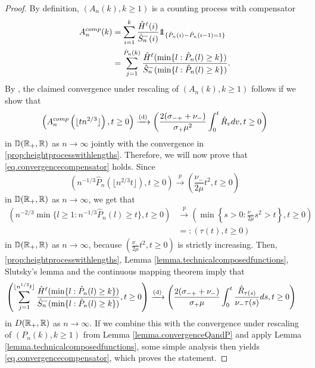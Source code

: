 \begin{proof}
By definition, $(A_n(k),k\geq 1)$ is a counting process with compensator 
\begin{align*}
    A_n^{comp}(k)&=\sum_{i=1}^k \frac{\hat{H}^\ell(i)}{\hat{S}^-_n(i)}\one_{\{\hat{P}_n(i)-\hat{P}_n(i-1)=1\}}\\
    &=\sum_{j=1}^{\hat{P}_n(k)}\frac{\hat{H}^\ell(\min\{l:\hat{P}_n(l)\geq k\})}{\hat{S}^-_n(\min\{l:\hat{P}_n(l)\geq k\})}.
\end{align*}
 By \citet[Theorem 14.2.VIII]{daleyIntroductionTheoryPoint2008}, the claimed convergence under rescaling of $(A_n(k),k\geq 1)$ follows if we show that 
\begin{equation}\label{eq.convergencecompensator}
    \left(A_n^{comp}\left(\lfloor tn^{2/3}\rfloor \right), t\geq 0\right)\xrightarrow[]{\mathrm{(d)}}\left(\frac{2(\sigma_{-+}+\nu_-)}{\sigma_+\mu^2} \int_0^t\hat{R}_v dv, t \geq 0\right)
\end{equation}
in ${\mathbb D}({\mathbb R}_+,{\mathbb R})$ as $n\to \infty$ jointly with the convergence in \cref{prop:heightprocesswithlengths}. Therefore, we will now prove that \cref{eq.convergencecompensator} holds. Since
$$\left(n^{-1/3}\hat{P}_n\left(\lfloor n^{2/3}t\rfloor \right),t\geq 0\right)\overset{p}{\to}\left(\frac{\nu_-}{2\mu}t^2,t\geq 0\right)$$
in ${\mathbb D}({\mathbb R}_+,{\mathbb R})$ as $n\to \infty$,
we get that
\begin{align*}\left(n^{-2/3}\min\{l\geq 1:n^{-1/3}\hat{P}_n(l)\geq t\},t\geq 0\right)&\overset{p}{\to}\left(\min\left\{s>0: \frac{\nu_-}{2\mu}s^2>t\right \}, t\geq 0\right)\\
&=:\left(\tau(t),t\geq 0\right) \end{align*}
in ${\mathbb D}({\mathbb R}_+,{\mathbb R})$ as $n\to \infty$, because $\left(\frac{\nu_-}{2\mu}t^2,t\geq 0\right)$ is strictly increasing. Then, \cref{prop:heightprocesswithlengths}, Lemma \ref{lemma.technicalcomposedfunctions}, Slutsky's lemma and the continuous mapping theorem imply that 
\begin{align*}&\left(\sum_{j=1}^{\lfloor n^{1/3}t\rfloor}\frac{\hat{H}^\ell(\min\{l:\hat{P}_n(l)\geq k\})}{\hat{S}^-_n(\min\{l:\hat{P}_n(l)\geq k\})},t\geq 0\right)\xrightarrow[]{\mathrm{(d)}} \left( \frac{2(\sigma_{-+}+\nu_-)}{\sigma_+\mu} \int_0^t \frac{\hat{R}_{\tau(s)}}{\nu_- \tau(s)}ds,t\geq 0 \right)
\end{align*}
in $D({\mathbb R}_+,{\mathbb R})$ as $n\to\infty$. If we combine this with the convergence under rescaling of $(P_n(k),k\geq 1)$ from Lemma \ref{lemma.convergenceQandP} and apply Lemma \ref{lemma.technicalcomposedfunctions}, some simple analysis then yields \cref{eq.convergencecompensator}, which proves the statement.
\end{proof}

